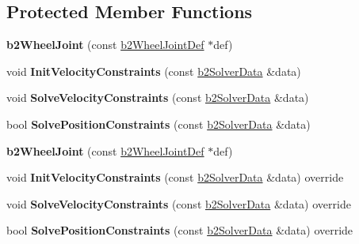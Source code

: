 \subsection*{Protected Member Functions}
\begin{DoxyCompactItemize}
\item 
\mbox{\label{classb2WheelJoint_a9c8bbb1068ddb46d074fe91802dd6a39}} 
{\bfseries b2\+Wheel\+Joint} (const \hyperlink{structb2WheelJointDef}{b2\+Wheel\+Joint\+Def} $\ast$def)
\item 
\mbox{\label{classb2WheelJoint_af3fc35c89dc253661297d69fe4a00a97}} 
void {\bfseries Init\+Velocity\+Constraints} (const \hyperlink{structb2SolverData}{b2\+Solver\+Data} \&data)
\item 
\mbox{\label{classb2WheelJoint_a09283ebe01298e6a2e897ca409b70289}} 
void {\bfseries Solve\+Velocity\+Constraints} (const \hyperlink{structb2SolverData}{b2\+Solver\+Data} \&data)
\item 
\mbox{\label{classb2WheelJoint_ae14faaa2cd91bdea615e86c0dd2ccc97}} 
bool {\bfseries Solve\+Position\+Constraints} (const \hyperlink{structb2SolverData}{b2\+Solver\+Data} \&data)
\item 
\mbox{\label{classb2WheelJoint_a9c8bbb1068ddb46d074fe91802dd6a39}} 
{\bfseries b2\+Wheel\+Joint} (const \hyperlink{structb2WheelJointDef}{b2\+Wheel\+Joint\+Def} $\ast$def)
\item 
\mbox{\label{classb2WheelJoint_a557c58a58cdf75d5b2c14c7f75a37575}} 
void {\bfseries Init\+Velocity\+Constraints} (const \hyperlink{structb2SolverData}{b2\+Solver\+Data} \&data) override
\item 
\mbox{\label{classb2WheelJoint_afbda202bc67d58cac38e3c5b138b93f7}} 
void {\bfseries Solve\+Velocity\+Constraints} (const \hyperlink{structb2SolverData}{b2\+Solver\+Data} \&data) override
\item 
\mbox{\label{classb2WheelJoint_addbe70ee831954312bc31dee1d52311f}} 
bool {\bfseries Solve\+Position\+Constraints} (const \hyperlink{structb2SolverData}{b2\+Solver\+Data} \&data) override
\end{DoxyCompactItemize}
